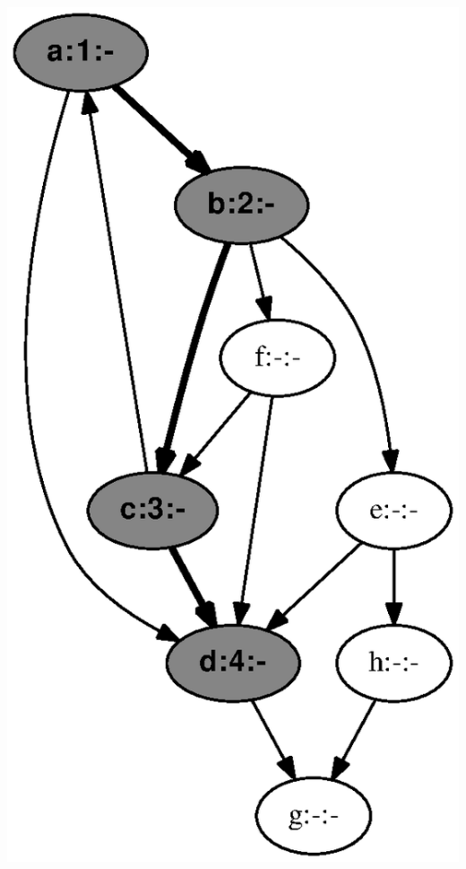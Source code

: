 \documentclass{article}
\begin{document}
\includegraphics[height=.3\textheight]{dfs_directed_classroom_04.eps}
\vspace{1em}
\end{document}
